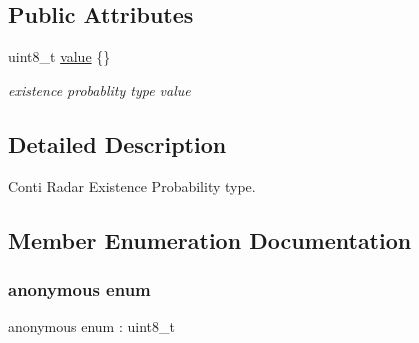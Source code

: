 \subsection*{Public Attributes}
\begin{DoxyCompactItemize}
\item 
uint8\+\_\+t \hyperlink{structmaf__perception__interface_1_1ContiRadarExistenceProbabilityType_a91c18725ada60f79897de22c470a85d2}{value} \{\}
\begin{DoxyCompactList}\small\item\em existence probablity type value \end{DoxyCompactList}\end{DoxyCompactItemize}


\subsection{Detailed Description}
Conti Radar Existence Probability type. 

\subsection{Member Enumeration Documentation}
\mbox{\label{structmaf__perception__interface_1_1ContiRadarExistenceProbabilityType_a1227569ccde0b17a13b23408e72a52a8}} 
\subsubsection{\texorpdfstring{anonymous enum}{anonymous enum}}
{\footnotesize\ttfamily anonymous enum \+: uint8\+\_\+t}


